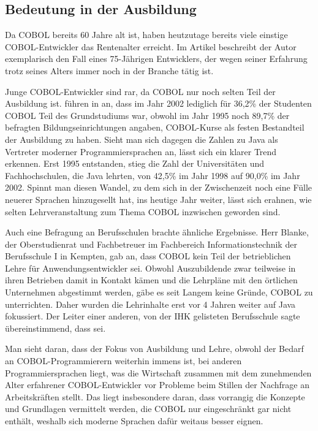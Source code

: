 \subsection*{Bedeutung in der Ausbildung}
Da COBOL bereits 60 Jahre alt ist, haben heutzutage bereits viele einstige COBOL-Entwickler das Rentenalter erreicht. Im Artikel  beschreibt der Autor exemplarisch den Fall eines 75-Jährigen Entwicklers, der wegen seiner Erfahrung trotz seines Alters immer noch in der Branche tätig ist.

Junge COBOL-Entwickler sind rar, da COBOL nur noch selten Teil der Ausbildung ist. \citeauthor{doke_cobol_2005} führen in  an, dass im Jahr 2002 lediglich für 36,2\% der Studenten COBOL Teil des Grundstudiums war, obwohl im Jahr 1995 noch 89,7\% der befragten Bildungseinrichtungen angaben, COBOL-Kurse als festen Bestandteil der Ausbildung zu haben. Sieht man sich dagegen die Zahlen zu Java als Vertreter moderner Programmiersprachen an, lässt sich ein klarer Trend erkennen. Erst 1995 entstanden, stieg die Zahl der Universitäten und Fachhochschulen, die Java lehrten, von 42,5\% im Jahr 1998 auf 90,0\% im Jahr 2002. Spinnt man diesen Wandel, zu dem sich in der Zwischenzeit noch eine Fülle neuerer Sprachen hinzugesellt hat, ins heutige Jahr weiter, lässt sich erahnen, wie selten Lehrveranstaltung zum Thema COBOL inzwischen geworden sind.

Auch eine Befragung an Berufsschulen brachte ähnliche Ergebnisse. Herr Blanke, der Oberstudienrat und Fachbetreuer im Fachbereich Informationstechnik der Berufsschule I in Kempten, gab an, dass COBOL kein Teil der betrieblichen Lehre für Anwendungsentwickler sei.  Obwohl Auszubildende zwar teilweise in ihren Betrieben damit in Kontakt kämen und die Lehrpläne mit den örtlichen Unternehmen abgestimmt werden, gäbe es seit Langem keine Gründe, COBOL zu unterrichten. Daher wurden die Lehrinhalte erst vor 4 Jahren weiter auf Java fokussiert. Der Leiter einer anderen, von der IHK gelisteten Berufsschule sagte übereinstimmend, dass  sei.

Man sieht daran, dass der Fokus von Ausbildung und Lehre, obwohl der Bedarf an COBOL-Programmierern weiterhin immens ist, bei anderen Programmiersprachen liegt, was die Wirtschaft zusammen mit dem zunehmenden Alter erfahrener COBOL-Entwickler vor Probleme beim Stillen der Nachfrage an Arbeitskräften stellt. Das liegt insbesondere daran, dass vorrangig die Konzepte und Grundlagen vermittelt werden, die COBOL nur eingeschränkt \bzw gar nicht enthält, weshalb sich moderne Sprachen dafür weitaus besser eignen.


